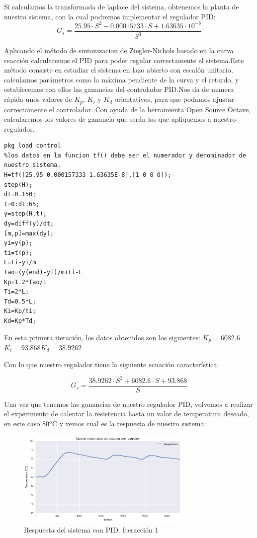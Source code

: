 Si calculamos la transformada de laplace del sistema, obtenemos la planta de nuestro sistema, con la cual podremos implementar el regulador PID:
$$G_s = \frac{25.95 \cdot S^2 - 0.00015733 \cdot S + 1.63635 \cdot 10^{-8}}{S^3}$$

Aplicando el método de sintonizacion de Ziegler-Nichols basado en la curva reacción calcularemos el PID para poder regular correctamente el sistema.Este método consiste en estudiar el sistema en lazo abierto con escalón unitario, calculamos parámetros como la máxima pendiente de la curva y el retardo, y establecemos con ellos las ganancias del controlador PID\cite{PID}.Nos da de manera rápida unos valores de $K_p$, $K_i$ y $K_d$ orientativos, para que podamos ajustar correctamente el controlador. Con ayuda de la herramienta Open Source Octave, calcularemos los valores de ganancia que serán los que apliquemos a nuestro regulador.

\Cpp
\begin{lstlisting}
pkg load control
%los datos en la funcion tf() debe ser el numerador y denominador de nuestro sistema.
H=tf([25.95 0.000157333 1.63635E-8],[1 0 0 0]);
step(H);
dt=0.150;
t=0:dt:65;
y=step(H,t);
dy=diff(y)/dt;
[m,p]=max(dy);
yi=y(p);
ti=t(p);
L=ti-yi/m
Tao=(y(end)-yi)/m+ti-L
Kp=1.2*Tao/L
Ti=2*L;
Td=0.5*L;
Ki=Kp/ti;
Kd=Kp*Td;
\end{lstlisting}

En esta primera iteración, los datos obtenidos son los siguientes:
$K_p = 6082.6$ $K_i=93.868 K_d=38.9262$

Con lo que nuestro regulador tiene la siguiente ecuación característica:

$$G_s = \frac{38.9262 \cdot S^2 + 6082.6 \cdot S + 93.868}{S}$$

Una vez que tenemos las ganancias de nuestro regulador PID, volvemos a realizar el experimento de calentar la resistencia hasta un valor de temperatura deseado, en este caso 80ºC y vemos cual es la respuesta de nuestro sistema:

    \begin{figure}[H]
            \centering
            \includegraphics[width=0.75\textwidth]{images/PLC/modelado/modelado_26_1.png}
            \caption{Respuesta del sistema con PID. Iteracción 1}
            \label{fig:plc_PID1}
    \end{figure}

